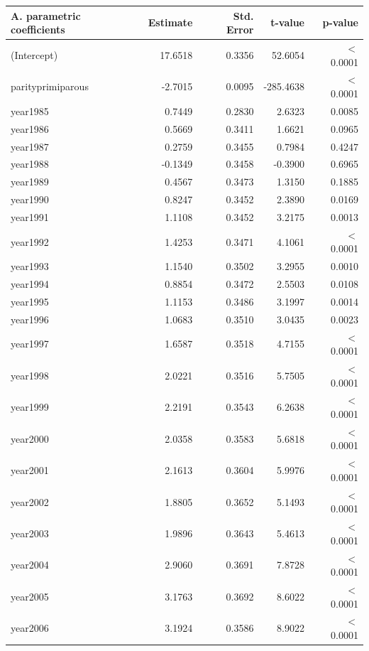     \begin{table}[H]
    \centering
    \begin{tabular}{lrrrr}
    \textbf{A. parametric coefficients} & Estimate & Std. Error & t-value & p-value \\ 
       \hline
       \hline
      (Intercept) & 17.6518 & 0.3356 & 52.6054 & $<$ 0.0001 \\ 
      parityprimiparous & -2.7015 & 0.0095 & -285.4638 & $<$ 0.0001 \\ 
      year1985 & 0.7449 & 0.2830 & 2.6323 & 0.0085 \\ 
      year1986 & 0.5669 & 0.3411 & 1.6621 & 0.0965 \\ 
      year1987 & 0.2759 & 0.3455 & 0.7984 & 0.4247 \\ 
      year1988 & -0.1349 & 0.3458 & -0.3900 & 0.6965 \\ 
      year1989 & 0.4567 & 0.3473 & 1.3150 & 0.1885 \\ 
      year1990 & 0.8247 & 0.3452 & 2.3890 & 0.0169 \\ 
      year1991 & 1.1108 & 0.3452 & 3.2175 & 0.0013 \\ 
      year1992 & 1.4253 & 0.3471 & 4.1061 & $<$ 0.0001 \\ 
      year1993 & 1.1540 & 0.3502 & 3.2955 & 0.0010 \\ 
      year1994 & 0.8854 & 0.3472 & 2.5503 & 0.0108 \\ 
      year1995 & 1.1153 & 0.3486 & 3.1997 & 0.0014 \\ 
      year1996 & 1.0683 & 0.3510 & 3.0435 & 0.0023 \\ 
      year1997 & 1.6587 & 0.3518 & 4.7155 & $<$ 0.0001 \\ 
      year1998 & 2.0221 & 0.3516 & 5.7505 & $<$ 0.0001 \\ 
      year1999 & 2.2191 & 0.3543 & 6.2638 & $<$ 0.0001 \\ 
      year2000 & 2.0358 & 0.3583 & 5.6818 & $<$ 0.0001 \\ 
      year2001 & 2.1613 & 0.3604 & 5.9976 & $<$ 0.0001 \\ 
      year2002 & 1.8805 & 0.3652 & 5.1493 & $<$ 0.0001 \\ 
      year2003 & 1.9896 & 0.3643 & 5.4613 & $<$ 0.0001 \\ 
      year2004 & 2.9060 & 0.3691 & 7.8728 & $<$ 0.0001 \\ 
      year2005 & 3.1763 & 0.3692 & 8.6022 & $<$ 0.0001 \\ 
      year2006 & 3.1924 & 0.3586 & 8.9022 & $<$ 0.0001 \\ 

\end{tabular}
\end{table}
